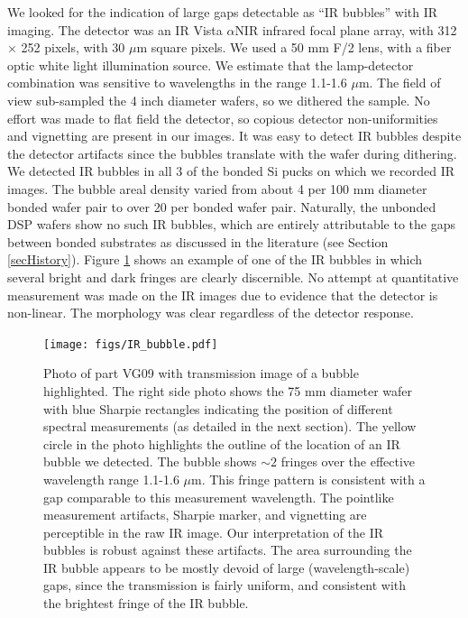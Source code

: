 \documentclass[osajnl,preprint,showpacs,superscriptaddress,12pt]{revtex4-1} %
\begin{document}
We looked for the indication of large gaps detectable as ``IR bubbles'' \cite{1992JEMat..21..669M} with IR imaging.  The detector was an IR Vista $\alpha$NIR infrared focal plane array, with 312 $\times$ 252 pixels, with 30 $\mu$m square pixels.  We used a 50 mm F/2 lens, with a fiber optic white light illumination source.  We estimate that the lamp-detector combination was sensitive to wavelengths in the range 1.1-1.6 $\mu$m.  The field of view sub-sampled the 4 inch diameter wafers, so we dithered the sample.  No effort was made to flat field the detector, so copious detector non-uniformities and vignetting are present in our images.  It was easy to detect IR bubbles despite the detector artifacts since the bubbles translate with the wafer during dithering.  We detected IR bubbles in all 3 of the bonded Si pucks on which we recorded IR images.  The bubble areal density varied from about 4 per 100 mm diameter bonded wafer pair to over 20 per bonded wafer pair.  Naturally, the unbonded DSP wafers show no such IR bubbles, which are entirely attributable to the gaps between bonded substrates as discussed in the literature (see Section \ref{secHistory}).  Figure \ref{IRbubble} shows an example of one of the IR bubbles in which several bright and dark fringes are clearly discernible.  No attempt at quantitative measurement was made on the IR images due to evidence that the detector is non-linear.  The morphology was clear regardless of the detector response.  


\begin{figure}[htbp]
\centerline{\texttt{[image: figs/IR\_bubble.pdf]}}
\caption{Photo of part VG09 with transmission image of a bubble highlighted\label{IRbubble}.  The right side photo shows the 75 mm diameter wafer with blue Sharpie rectangles indicating the position of different spectral measurements (as detailed in the next section).  The yellow circle in the photo highlights the outline of the location of an IR bubble we detected.  The bubble shows $\sim2$ fringes over the effective wavelength range 1.1-1.6 $\mu$m.  This fringe pattern is consistent with a gap comparable to this measurement wavelength.  The pointlike measurement artifacts, Sharpie marker, and vignetting are perceptible in the raw IR image.  Our interpretation of the IR bubbles is robust against these artifacts.  The area surrounding the IR bubble appears to be mostly devoid of large (wavelength-scale) gaps, since the transmission is fairly uniform, and consistent with the brightest fringe of the IR bubble.  }
\end{figure}
\end{document}
